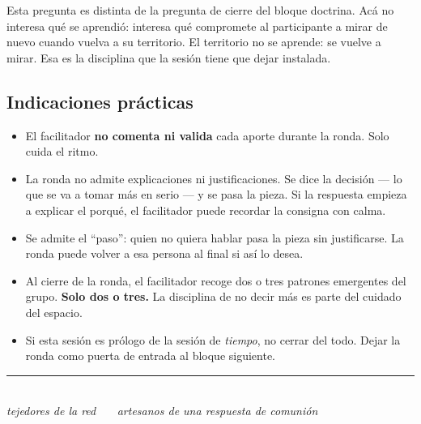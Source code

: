 \documentclass[11pt, a4paper]{article}
\begin{document}
\vspace{0.5em}

Esta pregunta es distinta de la pregunta de cierre del bloque doctrina. Acá no interesa qué se aprendió: interesa qué compromete al participante a mirar de nuevo cuando vuelva a su territorio. El territorio no se aprende: se vuelve a mirar. Esa es la disciplina que la sesión tiene que dejar instalada.

\subsection*{Indicaciones prácticas}

\begin{itemize}
  \item El facilitador \textbf{no comenta ni valida} cada aporte durante la ronda. Solo cuida el ritmo.
  \item La ronda no admite explicaciones ni justificaciones. Se dice la decisión --- lo que se va a tomar más en serio --- y se pasa la pieza. Si la respuesta empieza a explicar el porqué, el facilitador puede recordar la consigna con calma.
  \item Se admite el ``paso'': quien no quiera hablar pasa la pieza sin justificarse. La ronda puede volver a esa persona al final si así lo desea.
  \item Al cierre de la ronda, el facilitador recoge dos o tres patrones emergentes del grupo. \textbf{Solo dos o tres.} La disciplina de no decir más es parte del cuidado del espacio.
  \item Si esta sesión es prólogo de la sesión de \emph{tiempo}, no cerrar del todo. Dejar la ronda como puerta de entrada al bloque siguiente.
\end{itemize}

\vspace{2em}

\begin{center}
{\color{regla}\rule{0.35\linewidth}{0.5pt}}\\
\vspace{0.6em}
{\color{tenue}\itshape\small tejedores de la red \ \textbullet\ \ artesanos de una respuesta de comunión}
\end{center}
\end{document}

